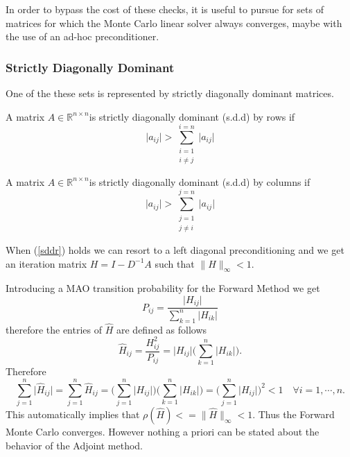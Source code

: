 In order to bypass the cost of these checks, it is useful to pursue for sets of
matrices for
which the Monte Carlo linear solver always converges, maybe with the use of an
ad-hoc preconditioner.

\subsubsection{Strictly Diagonally Dominant}

 One of the these sets is
represented by strictly diagonally dominant matrices.

\begin{defn}
 A matrix $A\in\mathbb{R}^{n\times n}$is strictly diagonally dominant (s.d.d)
by rows if
 \begin{equation}
    \lvert a_{ij}\rvert>\sum_{\substack{i=1\\ i\ne j}}^{i=n}\lvert
a_{ij}\rvert
\label{sddr}
 \end{equation}
\end{defn}

\begin{defn}
 A matrix $A\in\mathbb{R}^{n\times n}$is strictly diagonally dominant (s.d.d)
by columns if
 \begin{equation}
    \lvert a_{ij}\rvert>\sum_{\substack{j=1\\ j\ne i}}^{j=n}\lvert
a_{ij}\rvert
\label{sddc}
 \end{equation}
\end{defn}

When (\ref{sddr}) holds we can resort to a left diagonal preconditioning and we
get an iteration matrix $H=I-D^{-1}A$ such that $\lVert H \rVert_{\infty}<1$.

Introducing a MAO transition probability for the Forward Method we get
\[
 P_{ij}=\frac{\lvert H_{ij}\rvert}{\sum_{k=1}^n\lvert H_{ik}\rvert}
\]
therefore the entries of $\hat{H}$ are defined as follows
\[
 \hat{H}_{ij}=\frac{H^2_{ij}}{P_{ij}}=\lvert H_{ij}\rvert\bigg
(\sum_{k=1}^n\lvert
H_{ik}\rvert\bigg ).
\]
Therefore
\[
 \sum_{j=1}^n\lvert \hat{H}_{ij} \rvert = \sum_{j=1}^n \hat{H}_{ij} =\bigg
(\sum_{j=1}^n \lvert H_{ij}\rvert\bigg )\bigg (\sum_{k=1}^n\lvert
H_{ik}\rvert\bigg ) =\bigg
(\sum_{j=1}^n \lvert H_{ij}\rvert\bigg ) ^2 <1 \quad \forall i=1,\cdots, n.
\]
This automatically implies that $\rho(\hat{H})<=\lVert
\hat{H}\rVert_{\infty}<1$. Thus the Forward Monte Carlo converges.
However nothing a priori can be
stated about the behavior of the Adjoint method.\newline

